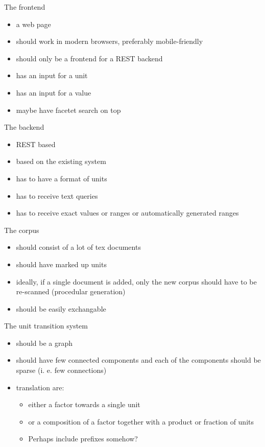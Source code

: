 \documentclass[11pt]{article}
\begin{document}
The frontend
\begin{itemize}
  \item a web page
  \item should work in modern browsers, preferably mobile-friendly
  \item should only be a frontend for a REST backend
  \item has an input for a unit
  \item has an input for a value
  \item maybe have facetet search on top
\end{itemize}

The backend
\begin{itemize}
  \item REST based
  \item based on the existing system
  \item has to have a format of units
  \item has to receive text queries
  \item has to receive exact values or ranges or automatically generated ranges
\end{itemize}

The corpus
\begin{itemize}
  \item should consist of a lot of tex documents
  \item should have marked up units
  \item ideally, if a single document is added, only the new corpus should have to be re-scanned (procedular generation)
  \item should be easily exchangable
\end{itemize}

The unit transition system
\begin{itemize}
  \item should be a graph
  \item should have few connected components and each of the components should be sparse (i. e. few connections)
  \item translation are:
  \begin{itemize}
    \item either a factor towards a single unit
    \item or a composition of a factor together with a product or fraction of units 
    \item Perhaps include prefixes somehow?
  \end{itemize}
\end{itemize}
\end{document}
